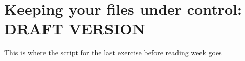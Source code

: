 \chapter[Version Control]{Keeping your files under control: DRAFT VERSION}


\begin{note}
  This is where the script for the last exercise before reading week goes

\end{note}

